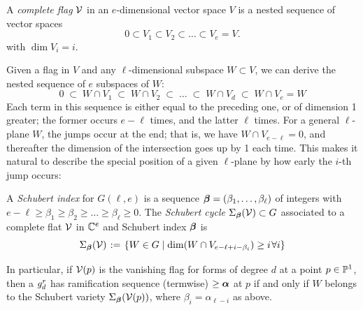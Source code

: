 \begin{definition}
A \emph{complete flag} $\cal V$  in an $e$-dimensional vector space $V$ is a nested sequence of vector spaces
$$
0 \subset V_1 \subset V_2 \subset \dots  \subset V_{e} = V.
$$
with $\dim V_i = i$.
\end{definition}

Given a flag in $V$ and any  $\ell$-dimensional subspace $W \subset V$, we can derive the nested sequence of $e$ subspaces of $W$:
$$
0 \; \subset \; W \cap V_1 \; \subset \;  W \cap V_2 \; \subset \;  \dots \; \subset \;  W \cap V_d \; \subset \;  W \cap V_{e} = W
$$
Each term in this sequence is either equal to the preceding one, or of dimension 1 greater; the former  occurs $e-\ell$ times, and the latter $\ell$ times. For a general $\ell $-plane $W$, the jumps occur at the end; that is, we have $W \cap V_{e-\ell} = 0$, and thereafter the dimension of the intersection goes up by 1 each time. This makes it natural
to describe the special position of a given $\ell $-plane by how early the $i$-th jump occurs: 

\begin{definition}
A \emph{Schubert index} for $G(\ell, e)$ is a sequence ${\bbeta} = (\beta_1,\dots,\beta_{\ell})$ of integers with $e-\ell \geq \beta_1 \geq \beta_2 \geq \dots \geq \beta_{\ell} \geq 0$.
The \emph{Schubert cycle $\Sigma_{\bbeta}({\cal V}) \subset G$} associated to a complete flat $\sV$ in $\CC^e$ and
Schubert index $\bbeta$  is 
$$
\Sigma_{\bbeta}({\cal V}) \; := \; \left\{ W \in G \mid \dim(W \cap V_{e-\ell+i-\beta_i}) \geq i \; \forall i \right\}
$$
\end{definition}
In particular, if $\sV(p)$ is the vanishing flag for forms of degree $d$ at a point $p\in \PP^{1}$, then
a $\grd$ has ramification sequence (termwise) $\geq \balpha$ at $p$ if and only if $W$ belongs
to the Schubert variety $\Sigma_{\bbeta}(\sV(p))$, where $\beta_{i} = \alpha_{\ell-i}$ as above.



